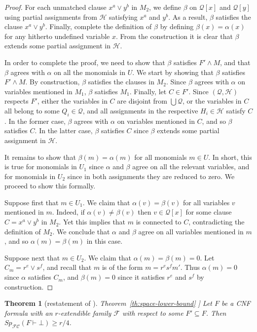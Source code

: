 \documentclass[11pt]{article}
\numberwithin{equation}{section}
\newtheorem{theorem}{Theorem}[section]
\theoremstyle{definition}
\theoremstyle{plain}
\newcommand{\expref}[2]{\hyperref[#2]{#1~\ref{#2}}}
\theoremstyle{plain}
\theoremstyle{definition}
\newcommand{\refth}[1]{\expref{Theorem}{#1}}
\newcommand{\Union}{\bigcup}
\newcommand{\proofsystemsubindexformat}[1]{\scriptscriptstyle{\mathcal{#1}}}
\newcommand{\derivabbrevsmall}[2]{( #1 \vdash #2 )}
\newcommand{\refutabbrevsmall}[1]{\derivabbrevsmall{#1}{\!\bot}}
\newcommand{\genericrefsmall}[3]{{\mathit{#1}}_{#2}\refutabbrevsmall{#3}}
\newcommand{\mspaceref}[2][]{\genericrefsmall{Sp}{#1}{#2}}
\newcommand{\fcnot}{\proofsystemsubindexformat{FC}}
\newcommand{\BGpart}[1]{\partitionnot[#1]}
\newcommand{\kextendiblenot}{r}
\newcommand{\akextendible}{an \mbox{$\kextendiblenot$-ex}\-tend\-ible\xspace}
\newcommand{\partitionnot}{\mathcal{Q}}
\newcommand{\assignmentsetnot}{\mathcal{H}}
\newcommand{\structuredassignmentsnot}[1][]{(\partitionnot #1,\assignmentsetnot #1)}
\newcommand{\kextendfamily}{\ensuremath{\mathcal{F}}\xspace}
\begin{document}
\begin{proof}
For each unmatched clause $x^a \lor y^b$ in $M_2$, we define $\beta$ on $\BGpart{x}$ and $\BGpart{y}$ using partial assignments from $\assignmentsetnot$ satisfying $x^a$ and $y^b$. As a result, $\beta$ satisfies the clause $x^a \lor y^b$. Finally, complete the definition of $\beta$ by defining $\beta(x) = \alpha(x)$ for any hitherto undefined variable $x$. From the construction it is clear that $\beta$ extends some partial assignment in $\assignmentsetnot$.

In order to complete the proof, we need to show that $\beta$ satisfies $F' \land M$, and that $\beta$ agrees with $\alpha$ on all the monomials in $U$. We start by showing that $\beta$ satisfies $F' \land M$. By construction, $\beta$ satisfies the clauses in $M_2$. Since $\beta$ agrees with $\alpha$ on variables mentioned in $M_1$, $\beta$ satisfies $M_1$. Finally, let $C \in F'$. Since $\structuredassignmentsnot$ respects $F'$, either the variables in $C$ are disjoint from $\Union \partitionnot$, or the variables in $C$ all belong to some $Q_i \in \partitionnot$, and all assignments in the respective $H_i \in \assignmentsetnot$ satisfy $C$. In the former case, $\beta$ agrees with $\alpha$ on variables mentioned in $C$, and so $\beta$ satisfies $C$. In the latter case, $\beta$ satisfies $C$ since $\beta$ extends some partial assignment in $\assignmentsetnot$.

It remains to show that $\beta(m) = \alpha(m)$ for all monomials $m \in U$. In short, this is true for monomials in $U_1$ since $\alpha$ and $\beta$ agree on all the relevant variables, and for monomials in $U_2$ since in both assignments they are reduced to zero. We proceed to show this formally.

Suppose first that $m \in U_1$. We claim that $\alpha(v) = \beta(v)$ for all variables $v$ mentioned in $m$. Indeed, if $\alpha(v) \neq \beta(v)$ then $v \in \BGpart{x}$ for some clause $C = x^a \lor y^b$ in $M_2$. Yet this implies that $m$ is connected to $C$, contradicting the definition of $M_2$. We conclude that $\alpha$ and $\beta$ agree on all variables mentioned in $m$, and so $\alpha(m) = \beta(m)$ in this case.

Suppose next that $m \in U_2$. 
We claim that $\alpha(m) = \beta(m) = 0$. Let $C_m = r^e \lor s^f$,
and recall that $m$ is of the form $m = r^e s^f m'$. 
Thus $\alpha(m) = 0$ since $\alpha$ satisfies $C_m$, and $\beta(m) =0$ 
since it satisfies $r^e$ and $s^f$ by construction.
\end{proof}

\begin{theorem}[restatement of \refth{th:space-lower-bound}
  \cite{BG15Framework}]
  Let $F$ be a CNF formula with \akextendible family $\kextendfamily$
  with respect to some $F'\subseteq F$. Then
  $\mspaceref[\fcnot]{F}\geq \kextendiblenot/4$.
\end{theorem}
\end{document}
